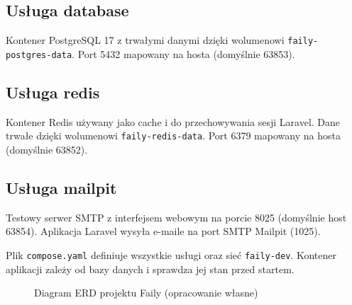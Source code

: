 \documentclass[12pt,a4paper]{article}
\begin{document}
\subsection{Usługa database}
Kontener PostgreSQL 17 z trwałymi danymi dzięki wolumenowi \texttt{faily-postgres-data}. Port 5432 mapowany na hosta (domyślnie 63853).

\subsection{Usługa redis}
Kontener Redis używany jako cache i do przechowywania sesji Laravel. Dane trwałe dzięki wolumenowi \texttt{faily-redis-data}. Port 6379 mapowany na hosta (domyślnie 63852).

\subsection{Usługa mailpit}
Testowy serwer SMTP z interfejsem webowym na porcie 8025 (domyślnie host 63854). Aplikacja Laravel wysyła e-maile na port SMTP Mailpit (1025).

Plik \texttt{compose.yaml} definiuje wszystkie usługi oraz sieć \texttt{faily-dev}. Kontener aplikacji zależy od bazy danych i sprawdza jej stan przed startem.

\newpage

\begin{figure}[H]
    \centering
    \caption{Diagram ERD projektu Faily (opracowanie własne)}
    \label{fig:diagram-erd}
\end{figure}
\end{document}
